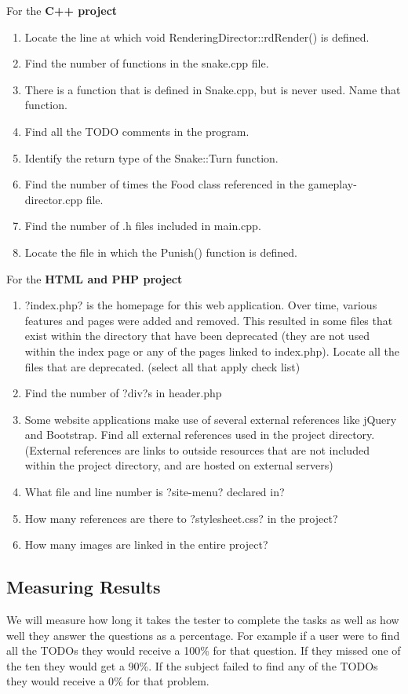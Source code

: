 \documentclass[letterpaper,10pt,titlepage,draftclsnofoot,onecolumn,onesided] {IEEEtran}
\begin{document}
	For the \textbf{C++ project}
	\begin{enumerate}
		\item Locate the line at which void RenderingDirector::rdRender() is defined. 
		\item Find the number of functions in the snake.cpp file.
		\item There is a function that is defined in Snake.cpp, but is never used. Name that function.
		\item Find all the TODO comments in the program.
		\item Identify the return type of the Snake::Turn function.
		\item Find the number of times the Food class referenced in the gameplay-director.cpp file.
		\item Find the number of .h files included in main.cpp.
		\item Locate the file in which the Punish() function is defined.
	\end{enumerate}
	
	For the \textbf{HTML and PHP project}
	\begin{enumerate}
		\item ?index.php? is the homepage for this web application. Over time, various features and pages were added and removed. This resulted in some files that exist within the directory that have been deprecated (they are not used within the index page or any of the pages linked to index.php). Locate all the files that are deprecated. (select all that apply check list)

		\item Find the number of ?div?s in header.php
		\item Some website applications make use of several external references like jQuery and Bootstrap. Find all external references used in the project directory. (External references are links to outside resources that are not included within the project directory, and are hosted on external servers)

		\item What file and line number is ?site-menu? declared in?
		\item How many references are there to ?stylesheet.css? in the project?
		\item How many images are linked in the entire project?
	\end{enumerate}
	
	\subsection{Measuring Results}
	We will measure how long it takes the tester to complete the tasks as well as how well they answer the questions as a percentage. 
	For example if a user were to find all the TODOs they would receive a 100\% for that question. 
	If they missed one of the ten they would get a 90\%.
	If the subject failed to find any of the TODOs they would receive a 0\% for that problem.
\end{document}

